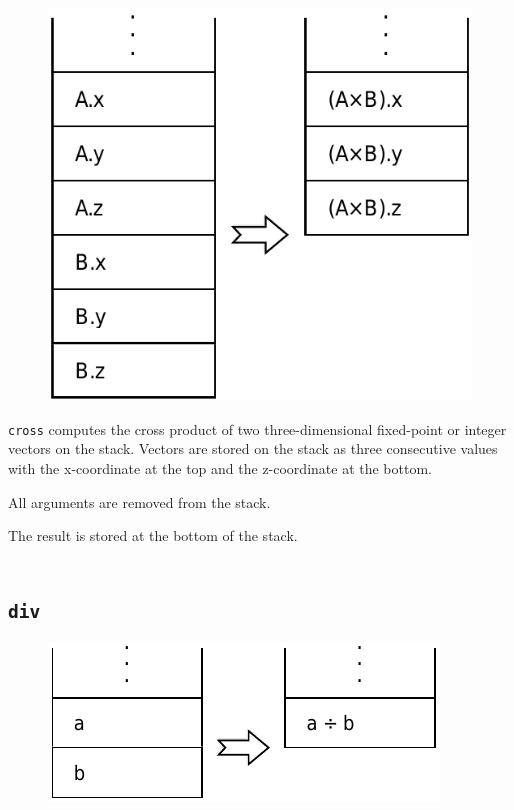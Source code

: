 		\begin{figure}
			\begin{flushright}
				\includegraphics[width=\linewidth]{figure/pdf/i_cross} 
			\end{flushright}
		\end{figure}
	
			\texttt{cross} computes the cross product of two three-dimensional
			fixed-point or integer vectors on the stack. Vectors are stored on
			the stack as three consecutive values with the x-coordinate at the
			top and the z-coordinate at the bottom.
			
			All arguments are removed from the stack.
			
			The result is stored at the bottom of the stack.\\\\
	
	\qquad\qquad
	
	\subsection*{\texttt{div}}
	
		\begin{figure}
			\begin{flushright}
				\includegraphics[width=\linewidth]{figure/pdf/i_div} 
			\end{flushright}
		\end{figure}
	
